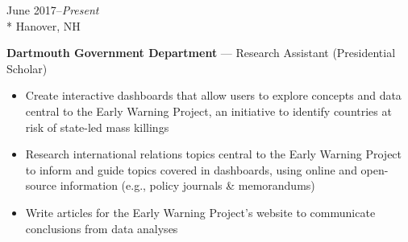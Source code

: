\documentclass[a4paper,9pt]{article}
\begin{document}
\vspace{-3ex}
\begin{minipage}[t]{0.20\linewidth}
	\begin{small}
		\begin{spacing}{1.10}
			\begin{flushright}
				June 2017--\textit{Present}
				\\*
				\vspace*{2.5pt}
				Hanover, NH
			\end{flushright}
		\end{spacing}
	\end{small}
\end{minipage}
\hspace{4mm}
\begin{minipage}[t]{0.75\linewidth}
	\begin{small}
		\begin{spacing}{1.10}
			\begin{flushleft}
				\textbf{Dartmouth Government Department} --- Research Assistant (Presidential Scholar)
				\begin{itemize}[itemsep=0pt,topsep=2.5pt,leftmargin=*]
					\item Create interactive dashboards that allow users to explore concepts and data central to the Early Warning Project,
					      an initiative to identify countries at risk of state-led mass killings
					\item Research international relations topics central to the Early Warning Project to inform and guide topics covered in dashboards, using online and open-source information (e.g., policy journals \& memorandums)
					\item Write articles for the Early Warning Project's website to communicate conclusions from data analyses
				\end{itemize}
			\end{flushleft}
		\end{spacing}
	\end{small}
\end{minipage}
\end{document}
